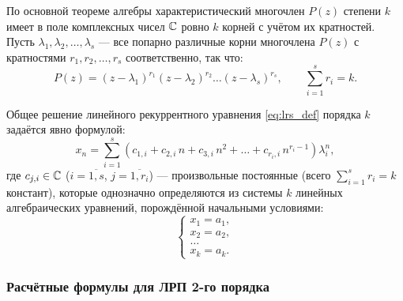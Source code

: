 По основной теореме алгебры характеристический многочлен $P(z)$ степени $k$ 
имеет в поле комплексных чисел $\mathbb{C}$ ровно $k$ корней с учётом их кратностей. 
Пусть $\lambda_1, \lambda_2, \dots, \lambda_s$ --- все попарно различные 
корни многочлена $P(z)$ с кратностями $r_1, r_2, \dots, r_s$ соответственно, 
так что:
\[
    P(z) = (z - \lambda_1)^{r_1} (z - \lambda_2)^{r_2} \dots (z - \lambda_s)^{r_s}, 
    \qquad \sum_{i=1}^{s} r_i = k.
\]

\begin{theorem}
    Общее решение линейного рекуррентного уравнения \eqref{eq:lrs_def} 
    порядка $k$ задаётся явно формулой:
    \begin{equation} \label{eq:lrs_gen_sol}
        x_n = \sum_{i=1}^{s} \left( c_{1,i} + c_{2,i} \, n + c_{3,i} \, n^2 + 
        \dots + c_{r_i, i} \, n^{r_i - 1} \right) \lambda_i^n, \tag{12}
    \end{equation}
    где $c_{j,i} \in \mathbb{C}$ ($i = \overline{1, s}$, $j = \overline{1, r_i}$) --- 
    произвольные постоянные (всего $\sum_{i=1}^s r_i = k$ констант), которые 
    однозначно определяются из системы $k$ линейных алгебраических 
    уравнений, порождённой начальными условиями:
    \[
        \begin{cases}
            x_1 = a_1, \\
            x_2 = a_2, \\
            \dots \\
            x_k = a_k.
        \end{cases}
    \]
\end{theorem}

\subsubsection{Расчётные формулы для ЛРП 2-го порядка}


